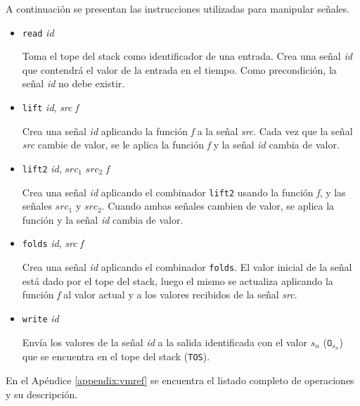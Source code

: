   A continuación se presentan las instrucciones utilizadas para manipular
señales.
  \begin{itemize}

\item {
    \texttt{read} \textit{id}

      Toma el tope del stack como identificador de una entrada.
      Crea una señal \textit{id} que contendrá el valor de la entrada
    en el tiempo.
      Como precondición, la señal \textit{id} no debe existir.

    
}
\item {
    \texttt{lift} \textit{id}, \textit{src} \textit{f}

      Crea una señal \textit{id} aplicando la función \textit{f}
    a la señal \textit{src}.
      Cada vez que la señal \textit{src} cambie de valor, se le aplica
      la función \textit{f} y la señal \textit{id} cambia de valor.
  
    
}
\item {
  \texttt{lift2} \textit{id}, $\textit{src}_1$ $\textit{src}_2$ \textit{f}

      Crea una señal \textit{id} aplicando el combinador \texttt{lift2}
    usando la función \textit{f}, y las señales $\textit{src}_1$ y
  $\textit{src}_2$.
      Cuando ambas señales cambien de valor, se aplica la función
      y la señal \textit{id} cambia de valor.

    
}
\item {
    \texttt{folds} \textit{id}, \textit{src} \textit{f}

      Crea una señal \textit{id} aplicando el combinador \texttt{folds}.
    El valor inicial de la señal está dado por el tope del stack, luego
    el mismo se actualiza aplicando la función \textit{f} al valor actual
    y a los valores recibidos de la señal \textit{src}.

    
}
\item {
    \texttt{write} \textit{id}

    Envía los valores de la señal \textit{id} a la salida identificada
    con el valor $s_n$ ($\texttt{O}_{s_n}$) que se encuentra en el
    tope del stack (\texttt{TOS}).
    
    
}
\end{itemize}

  En el Apéndice \ref{appendix:vmref} se encuentra el listado completo
  de operaciones y su descripción.
